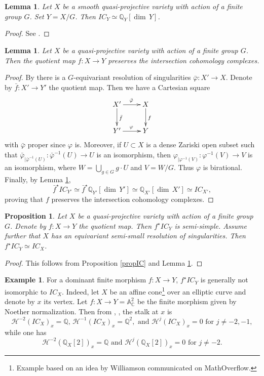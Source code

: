 \documentclass[11pt, reqno]{amsart}
\theoremstyle{plain}
\newtheorem{lemma}[theorem]{Lemma}
\newtheorem{proposition}[theorem]{Proposition}
\theoremstyle{definition}
\newtheorem{example}[theorem]{Example}
\theoremstyle{remark}
\begin{document}
\begin{lemma}\label{lem-G-smooth}
Let $X$ be a smooth quasi-projective variety with action of a finite group $G$. Set $Y =  X/G$.
 Then
$IC_{Y}\simeq \mathbb{Q}_{Y}[\dim\, Y]$.
\end{lemma}
\begin{proof}
See \cite[Section 5, Proposition 3]{GS93}.
\end{proof}
\begin{lemma}\label{lem-GactIC}
Let $X$ be a quasi-projective variety with action of a finite group $G$. Then the quotient map $f: X\rightarrow Y$ preserves 
the intersection cohomology complexes. 
\end{lemma}
\begin{proof}
By \cite{AW97} there is a $G$-equivariant resolution of singularities $\bar{\varphi}: X'\rightarrow X$. Denote
by $\bar{f}: X'\rightarrow Y'$ the quotient map. Then we have a Cartesian square
 $$\xymatrix{
      X'\ar[r]^{\bar{\varphi}} \ar[d] ^{\bar{f}} & X\ar[d]^{f}\\ Y' \ar[r]^{\varphi} & Y }$$ 
with $\bar{\varphi}$ proper since $\varphi$ is. Moreover, if $U\subset X$ is a dense Zariski
open subset such that  
$\bar{\varphi}_{|\bar{\varphi}^{-1}(U)}: \bar{\varphi}^{-1}(U)\rightarrow U$
is an isomorphism, then
$\varphi_{|\varphi^{-1}(V)}: \varphi^{-1}(V)\rightarrow V$
is an isomorphism, where $W  =  \bigcup_{g\in G} g\cdot U$ and $V = W/G$. Thus $\varphi$ is birational. 
Finally, by Lemma \ref{lem-G-smooth}, 
$$\bar{f}^{\star} IC_{Y'}\simeq \bar{f}^{\star}\mathbb{Q}_{Y'}[\dim\, Y']\simeq \mathbb{Q}_{X'}[\dim\, X']\simeq IC_{X'},$$
proving that $f$ preserves the intersection cohomology complexes.
\end{proof}
\begin{proposition}\label{prop-IC-G-X}
Let $X$ be a quasi-projective variety with action of a finite group $G$.  Denote by $f: X\rightarrow Y$ the quotient map. 
Then $f^{\star}IC_{Y}$ is semi-simple.  Assume further that $X$ has an equivariant semi-small resolution
of singularities.
Then $f^{\star} IC_{Y}\simeq IC_{X}$. 
\end{proposition}
\begin{proof}
This follows from Proposition \ref{propIC} and Lemma \ref{lem-GactIC}.
\end{proof}
\begin{example}
For a dominant finite morphism $f:X\rightarrow Y$, $f^{\star}IC_{Y}$ is generally not isomorphic to $IC_{X}$. Indeed, let $X$ be an affine cone\footnote{Example based on an idea by Williamson communicated on MathOverflow.} over an elliptic curve
and denote by $x$ its vertex. Let $f: X\rightarrow  Y =  \mathbb{A}_{\mathbb{C}}^{2}$ be the finite morphism
given by Noether normalization. Then from
\cite[Lemma 2.1]{Fie91}, \cite[Lemma 6.5]{DL91}, the stalk at $x$ is
$$\mathcal{H}^{-2}(IC_{X})_{x}  =  \mathbb{Q},\, \mathcal{H}^{-1}(IC_{X})_{x} =  \mathbb{Q}^{2}, \text{ and }\mathcal{H}^{j}(IC_{X})_{x}= 0 \text{ for } j\neq -2,-1,$$
while one has 
$$\mathcal{H}^{-2}(\mathbb{Q}_{X}[2])_{x}  =  \mathbb{Q}\text{ and } \mathcal{H}^{j}(\mathbb{Q}_{X}[2])_{x} = 0 \text{ for }j\neq -2.$$
\end{example}
\end{document}
